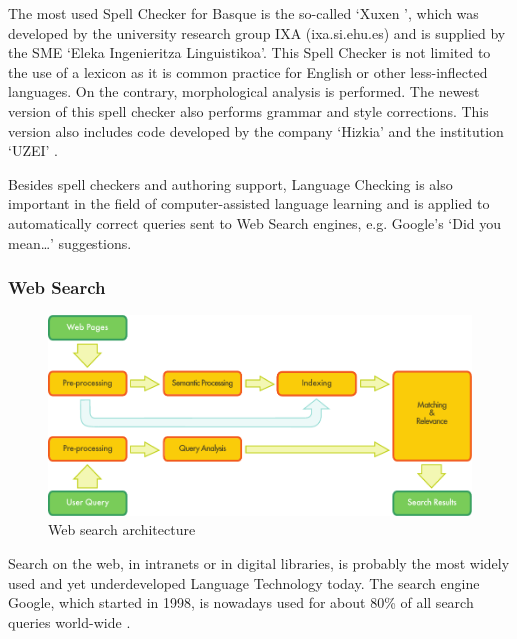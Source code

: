 \begin{multicols}{2}

The most used Spell Checker for Basque is the so-called ‘Xuxen \cite{BAS-Nota24}’, which was developed by the university research group IXA (ixa.si.ehu.es) and is supplied by the SME ‘Eleka Ingenieritza Linguistikoa’. This Spell Checker is not limited to the use of a lexicon as it is common practice for English or other less-inflected languages. On the contrary, morphological analysis is performed. The newest version of this spell checker also performs grammar and style corrections. This version also includes code developed by the company ‘Hizkia’ \cite{BAS-Nota25} and the institution ‘UZEI’ \cite{BAS-Nota26}. 

Besides spell checkers and authoring support, Language Checking is also important in the field of computer-assisted language learning and is applied to automatically correct queries sent to Web Search engines, e.g. Google’s ‘Did you mean…’ suggestions. 

\subsubsection{Web Search}
\begin{figure}[htb]
  \center
  \includegraphics[width=\textwidth]{../_media/english/web_search_architecture}
  \caption{Web search architecture}
  \label{fig:websearcharch_en}
 \end{figure}
 
    Search on the web, in intranets or in digital libraries, is probably the most widely used and yet underdeveloped Language Technology today. The search engine Google, which started in 1998, is nowadays used for about 80\% of all search queries world-wide \cite{BAS-Nota27}.
 

\end{multicols}
